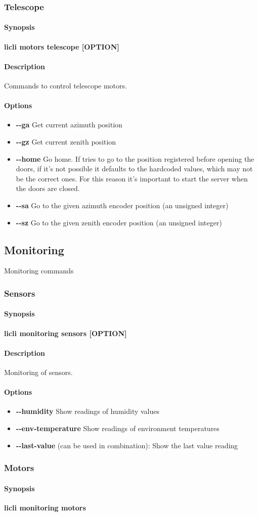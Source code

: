 \documentclass[letterpaper, 10 pt]{article}
\newcommand{\cmdsection}[1]{\paragraph{#1}\mbox{}\par}
\begin{document}
\subsubsection{Telescope}
\cmdsection{Synopsis} \textbf{licli motors telescope [OPTION]}\\

\cmdsection{Description} Commands to control telescope motors. \\
\cmdsection{Options}
\begin{itemize}
	\item[] \textbf{-{}-ga} Get current azimuth position
	\item[] \textbf{-{}-gz} Get current zenith position
	\item[] \textbf{-{}-home} Go home. If tries to go to the position registered before opening the doors, if it's not possible it defaults to the hardcoded values, which may not be the correct ones. For this reason it's important to start the server when the doors are closed.
	\item[] \textbf{-{}-sa} Go to the given azimuth encoder position (an unsigned integer)
	\item[] \textbf{-{}-sz} Go to the given zenith encoder position (an unsigned integer)
\end{itemize}
\subsection{Monitoring}
Monitoring commands
\subsubsection{Sensors}
\cmdsection{Synopsis} \textbf{licli monitoring sensors [OPTION]}\\

\cmdsection{Description} Monitoring of sensors.\\
\cmdsection{Options}
\begin{itemize}
	\item[] \textbf{-{}-humidity} Show readings of humidity values 
	\item[] \textbf{-{}-env-temperature} Show readings of environment temperatures
	\item[] \textbf{-{}-last-value} (can be used in combination): Show the last value reading
\end{itemize}
\subsubsection{Motors}
\cmdsection{Synopsis} \textbf{licli monitoring motors}\\
\end{document}
